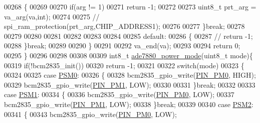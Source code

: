 \begin{DoxyCode}
00268                 \{
00269                 
00270                     \textcolor{keywordflow}{if}(arg != 1)
00271                      \textcolor{keywordflow}{return} -1;
00272                                                                             
00273                     uint8\_t prt\_arg = va\_arg(va,\textcolor{keywordtype}{int});
00274                      
00275                        \textcolor{comment}{// spi\_ram\_protection(prt\_arg,CHIP\_ADDRESS1);  }
00276             
00277                 \}\textcolor{keywordflow}{break};
00278                 
00279                 
00280                 
00281               
00282 
00283                 
00284                 
00285                 \textcolor{keywordflow}{default}:
00286                 \{    
00287                   \textcolor{comment}{// return -1;}
00288                 \}\textcolor{keywordflow}{break};
00289      
00290         \}
00291      
00292         va\_end(va);
00293             
00294 \textcolor{keywordflow}{return} 0;   
00295 \}
00296 
00298 
00308 
00309 int8\_t \hyperlink{a00005_gae9a5abd4e5054e7ea3f149b1764f2cd0}{ade7880\_power\_mode}(uint8\_t mode)\{
00319          \textcolor{keywordflow}{if}(!bcm2835\_init())
00320            \textcolor{keywordflow}{return} -1;
00321            
00322         \textcolor{keywordflow}{switch}(mode)
00323         \{
00324                         
00325                 \textcolor{keywordflow}{case}  \hyperlink{a00037_ad03c0079a6239f78368cb14cc4578101}{PSM0}:
00326                 \{    
00328                      bcm2835\_gpio\_write(\hyperlink{a00039_aef7884a448449013ba1f8b46b8df5c05}{PIN\_PM0}, HIGH);     
00329                      bcm2835\_gpio\_write(\hyperlink{a00039_a93e6f13f663a3ca8bcf6efe2022c9b78}{PIN\_PM1}, LOW);
00330                       
00331                 \}\textcolor{keywordflow}{break};
00332                 
00333                  \textcolor{keywordflow}{case}  \hyperlink{a00037_aecb578b36faffafc55d7e5bfbe26df6a}{PSM1}:
00334                 \{
00336                      bcm2835\_gpio\_write(\hyperlink{a00039_aef7884a448449013ba1f8b46b8df5c05}{PIN\_PM0}, LOW);     
00337                      bcm2835\_gpio\_write(\hyperlink{a00039_a93e6f13f663a3ca8bcf6efe2022c9b78}{PIN\_PM1}, LOW);
00338                 \}\textcolor{keywordflow}{break};
00339                 
00340                  \textcolor{keywordflow}{case}  \hyperlink{a00037_a954ec88a13030fa5878310aa79f92b59}{PSM2}:
00341                 \{
00343                      bcm2835\_gpio\_write(\hyperlink{a00039_aef7884a448449013ba1f8b46b8df5c05}{PIN\_PM0}, LOW);     

\end{DoxyCode}
